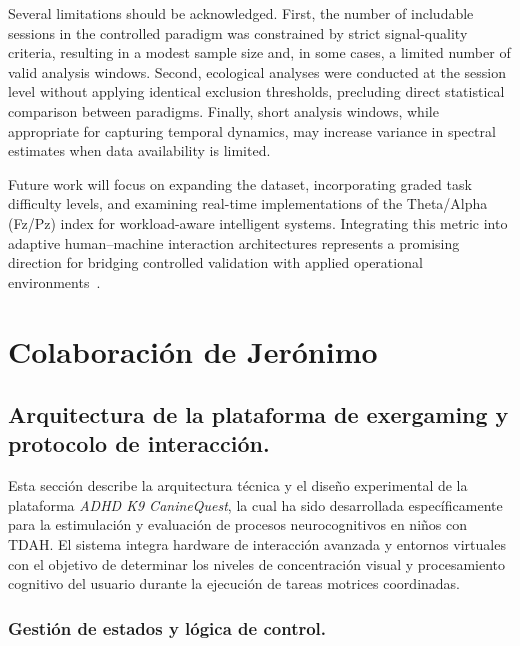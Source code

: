 \documentclass[10pt]{iopart}
\begin{document}
Several limitations should be acknowledged. First, the number of includable sessions in the controlled paradigm was constrained by strict signal-quality criteria, resulting in a modest sample size and, in some cases, a limited number of valid analysis windows. Second, ecological analyses were conducted at the session level without applying identical exclusion thresholds, precluding direct statistical comparison between paradigms. Finally, short analysis windows, while appropriate for capturing temporal dynamics, may increase variance in spectral estimates when data availability is limited.

Future work will focus on expanding the dataset, incorporating graded task difficulty levels, and examining real-time implementations of the Theta/Alpha (Fz/Pz) index for workload-aware intelligent systems. Integrating this metric into adaptive human--machine interaction architectures represents a promising direction for bridging controlled validation with applied operational environments~\cite{c10}.

\section{Colaboración de Jerónimo}



\subsection{Arquitectura de la plataforma de exergaming y protocolo de interacción.}

Esta sección describe la arquitectura técnica y el diseño experimental de la plataforma \textit{ADHD K9 CanineQuest}, la cual ha sido desarrollada específicamente para la estimulación y evaluación de procesos neurocognitivos en niños con TDAH. El sistema integra hardware de interacción avanzada y entornos virtuales con el objetivo de determinar los niveles de concentración visual y procesamiento cognitivo del usuario durante la ejecución de tareas motrices coordinadas.

\subsubsection{Gestión de estados y lógica de control.}
\end{document}

